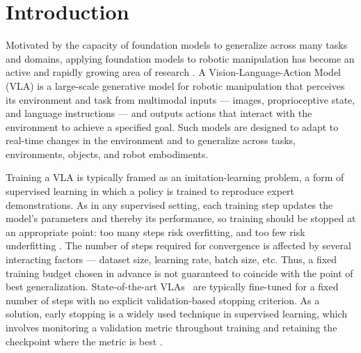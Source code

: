 \documentclass[english,12pt,a4paper,pdftex,elec,utf8]{aaltothesis}
\begin{document}

\thispagestyle{empty}

\section{Introduction}
\label{sec:intro}

Motivated by the capacity of foundation models to generalize across many tasks and domains, applying foundation models to robotic manipulation has become an active and rapidly growing area of research \cite{vlasurvey}. A Vision-Language-Action Model (VLA) is a large-scale generative model for robotic manipulation that perceives its environment and task from multimodal inputs --- images, proprioceptive state, and language instructions --- and outputs actions that interact with the environment to achieve a specified goal. Such models are designed to adapt to real-time changes in the environment and to generalize across tasks, environments, objects, and robot embodiments.

Training a VLA is typically framed as an imitation-learning problem, a form of supervised learning in which a policy is trained to reproduce expert demonstrations. As in any supervised setting, each training step updates the model's parameters and thereby its performance, so training should be stopped at an appropriate point: too many steps risk overfitting, and too few risk underfitting \cite{ying2019overview}.
The number of steps required for convergence is affected by several interacting factors ---
dataset size, learning rate, batch size, etc. Thus, a fixed training budget chosen in
advance is not guaranteed to coincide with the point of best generalization. State-of-the-art VLAs~\cite{kim2024openvla,shukor2025smolvla,black2024pi0} are typically fine-tuned for a fixed number of steps with no explicit validation-based stopping criterion. As a solution, early stopping is a widely used technique in supervised learning, which involves monitoring a validation metric throughout training and retaining the checkpoint where the metric is best \cite{goodfellow2016deep}. 
\end{document}
